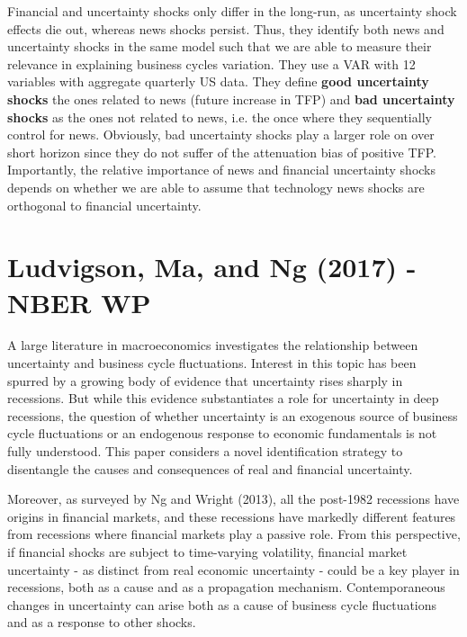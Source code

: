 \documentclass{article}
\begin{document}
{Financial and uncertainty shocks only differ in the long-run, as uncertainty shock effects die out, whereas news shocks persist. Thus, they identify both news and uncertainty shocks in the same model such that we are able to measure their relevance in explaining business cycles variation. They use a VAR with 12 variables with aggregate quarterly US data. They define \textbf{good uncertainty shocks} the ones related to news (future increase in TFP) and \textbf{bad uncertainty shocks} as the ones not related to news, i.e. the once where they sequentially control for news. Obviously, bad uncertainty shocks play a larger role on over short horizon since they do not suffer of the attenuation bias of positive TFP. Importantly, the relative importance of news and financial uncertainty shocks depends on whether we are able to assume that technology news shocks are orthogonal to financial uncertainty.


\section{Ludvigson, Ma, and Ng (2017) - NBER WP}

A large literature in macroeconomics investigates the relationship between uncertainty and business cycle fluctuations. Interest in this topic has been spurred by a growing body of evidence that uncertainty rises sharply in recessions. But while this evidence substantiates a role for uncertainty in deep recessions, the question of whether uncertainty is an exogenous source of business cycle fluctuations or an endogenous response to economic fundamentals is not fully understood. This paper considers a novel identification strategy to disentangle the causes and consequences of real and financial uncertainty. 

Moreover, as surveyed by Ng and Wright (2013), all the post-1982 recessions have origins in financial markets, and these recessions have markedly different features from recessions where financial markets play a passive role. From this perspective, if financial shocks are subject to time-varying volatility, financial market uncertainty - as distinct from real economic uncertainty - could be a key player in recessions, both as a cause and as a propagation mechanism. Contemporaneous changes in uncertainty can arise both as a cause of business cycle fluctuations and as a response to other shocks. 

}
\end{document}
